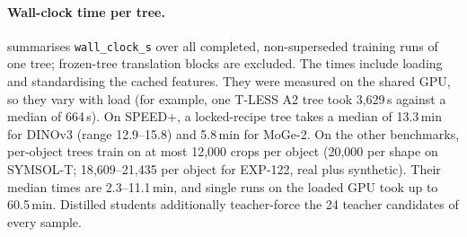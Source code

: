 \paragraph{Wall-clock time per tree.}
 summarises \texttt{wall\_clock\_s} over all completed, non-superseded training runs of one tree; frozen-tree translation blocks are excluded. The times include loading and standardising the cached features. They were measured on the shared GPU, so they vary with load (for example, one T-LESS A2 tree took 3{,}629\,s against a median of 664\,s).
On SPEED+, a locked-recipe tree takes a median of 13.3\,min for DINOv3 (range 12.9--15.8) and 5.8\,min for MoGe-2. On the other benchmarks, per-object trees train on at most 12{,}000 crops per object (20{,}000 per shape on SYMSOL-T; 18{,}609--21{,}435 per object for EXP-122, real plus synthetic). Their median times are 2.3--11.1\,min, and single runs on the loaded GPU took up to 60.5\,min. Distilled students additionally teacher-force the 24 teacher candidates of every sample.

